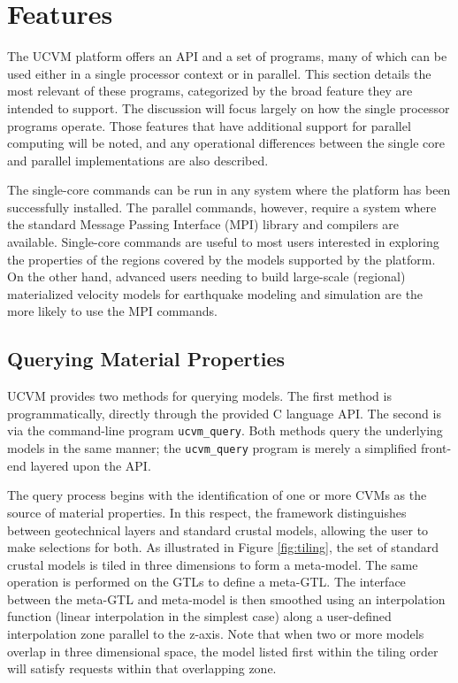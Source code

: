 
\section{Features}
\label{sec:features}

The UCVM platform offers an API and a set of programs, many of which can be used either in a single processor context or in parallel. This section details the most relevant of these programs, categorized by the broad feature they are intended to support. The discussion will focus largely on how the single processor programs operate. Those features that have additional support for parallel computing will be noted, and any operational differences between the single core and parallel implementations are also described.

The single-core commands can be run in any system where the platform has been successfully installed. The parallel commands, however, require a system where the standard Message Passing Interface (MPI) library and compilers are available. Single-core commands are useful to most users interested in exploring the properties of the regions covered by the models supported by the platform. On the other hand, advanced users needing to build large-scale (regional) materialized velocity models for earthquake modeling and simulation are the more likely to use the MPI commands. 



\subsection{Querying Material Properties}
\label{sec:querying}

UCVM provides two methods for querying models. The first method is programmatically, directly through the provided C language API. The second is via the command-line program \texttt{ucvm\_query}. Both methods query the underlying models in the same manner; the \texttt{ucvm\_query} program is merely a simplified front-end layered upon the API.

The query process begins with the identification of one or more CVMs as the source of material properties. In this respect, the framework distinguishes between geotechnical layers and standard crustal models, allowing the user to make selections for both. As illustrated in Figure \ref{fig:tiling}, the set of standard crustal models is tiled in three dimensions to form a meta-model. The same operation is performed on the GTLs to define a meta-GTL. The interface between the meta-GTL and meta-model is then smoothed using an interpolation function (linear interpolation in the simplest case) along a user-defined interpolation zone parallel to the z-axis. Note that when two or more models overlap in three dimensional space, the model listed first within the tiling order will satisfy requests within that overlapping zone.

